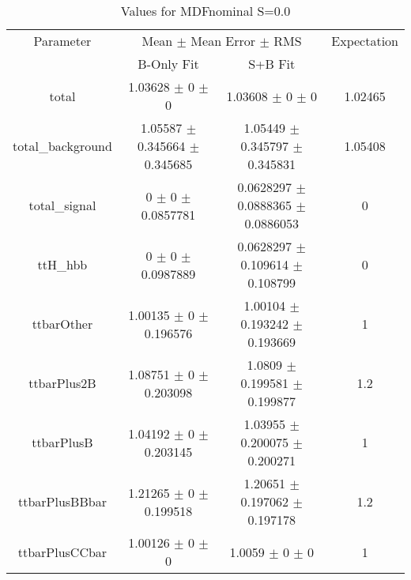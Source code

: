 \begin{table}
\centering
\caption{Values for MDFnominal S=0.0}
\begin{tabular}{cccc}
\toprule
Parameter & \multicolumn{2}{c}{Mean $\pm$ Mean Error $\pm$ RMS} & Expectation\\
 & B-Only Fit & S+B Fit & \\
\midrule
total & \num{1.03628} $\pm$ \num{0} $\pm$ \num{0} & \num{1.03608} $\pm$ \num{0} $\pm$ \num{0} & \num{1.02465}\\
total\_background & \num{1.05587} $\pm$ \num{0.345664} $\pm$ \num{0.345685} & \num{1.05449} $\pm$ \num{0.345797} $\pm$ \num{0.345831} & \num{1.05408}\\
total\_signal & \num{0} $\pm$ \num{0} $\pm$ \num{0.0857781} & \num{0.0628297} $\pm$ \num{0.0888365} $\pm$ \num{0.0886053} & \num{0}\\
ttH\_hbb & \num{0} $\pm$ \num{0} $\pm$ \num{0.0987889} & \num{0.0628297} $\pm$ \num{0.109614} $\pm$ \num{0.108799} & \num{0}\\
ttbarOther & \num{1.00135} $\pm$ \num{0} $\pm$ \num{0.196576} & \num{1.00104} $\pm$ \num{0.193242} $\pm$ \num{0.193669} & \num{1}\\
ttbarPlus2B & \num{1.08751} $\pm$ \num{0} $\pm$ \num{0.203098} & \num{1.0809} $\pm$ \num{0.199581} $\pm$ \num{0.199877} & \num{1.2}\\
ttbarPlusB & \num{1.04192} $\pm$ \num{0} $\pm$ \num{0.203145} & \num{1.03955} $\pm$ \num{0.200075} $\pm$ \num{0.200271} & \num{1}\\
ttbarPlusBBbar & \num{1.21265} $\pm$ \num{0} $\pm$ \num{0.199518} & \num{1.20651} $\pm$ \num{0.197062} $\pm$ \num{0.197178} & \num{1.2}\\
ttbarPlusCCbar & \num{1.00126} $\pm$ \num{0} $\pm$ \num{0} & \num{1.0059} $\pm$ \num{0} $\pm$ \num{0} & \num{1}\\
\bottomrule
\end{tabular}
\end{table}